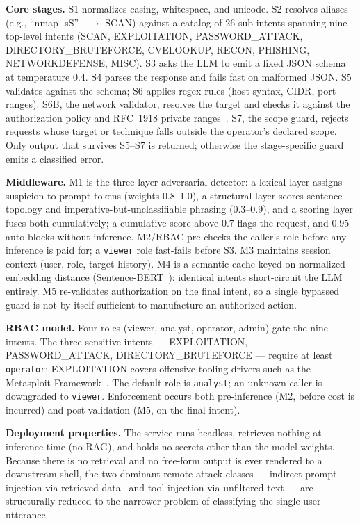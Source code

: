 \documentclass[conference]{IEEEtran}
\begin{document}
\textbf{Core stages.} S1 normalizes casing, whitespace, and unicode. S2 resolves aliases (e.g., ``nmap -sS''~\cite{lyon2009nmap} $\rightarrow$ SCAN) against a catalog of 26 sub-intents spanning nine top-level intents (SCAN, EXPLOITATION, PASSWORD\_\-ATTACK, DIRECTORY\_\-BRUTE\-FORCE, CVE\-LOOKUP, RECON, PHISHING, NETWORK\-DEFENSE, MISC). S3 asks the LLM to emit a fixed JSON schema at temperature 0.4. S4 parses the response and fails fast on malformed JSON. S5 validates against the schema; S6 applies regex rules (host syntax, CIDR, port ranges). S6B, the network validator, resolves the target and checks it against the authorization policy and RFC~1918 private ranges~\cite{rfc1918}. S7, the scope guard, rejects requests whose target or technique falls outside the operator's declared scope. Only output that survives S5--S7 is returned; otherwise the stage-specific guard emits a classified error.

\textbf{Middleware.} M1 is the three-layer adversarial detector: a lexical layer assigns suspicion to prompt tokens (weights 0.8--1.0), a structural layer scores sentence topology and imperative-but-unclassifiable phrasing (0.3--0.9), and a scoring layer fuses both cumulatively; a cumulative score above 0.7 flags the request, and 0.95 auto-blocks without inference. M2/RBAC pre checks the caller's role before any inference is paid for; a \texttt{viewer} role fast-fails before S3. M3 maintains session context (user, role, target history). M4 is a semantic cache keyed on normalized embedding distance (Sentence-BERT~\cite{reimers2019sbert}): identical intents short-circuit the LLM entirely. M5 re-validates authorization on the final intent, so a single bypassed guard is not by itself sufficient to manufacture an authorized action.

\textbf{RBAC model.} Four roles (viewer, analyst, operator, admin) gate the nine intents. The three sensitive intents --- EXPLOITATION, PASSWORD\_ATTACK, DIRECTORY\_BRUTEFORCE --- require at least \texttt{operator}; EXPLOITATION covers offensive tooling drivers such as the Metasploit Framework~\cite{metasploit}. The default role is \texttt{analyst}; an unknown caller is downgraded to \texttt{viewer}. Enforcement occurs both pre-inference (M2, before cost is incurred) and post-validation (M5, on the final intent).

\textbf{Deployment properties.} The service runs headless, retrieves nothing at inference time (no RAG), and holds no secrets other than the model weights. Because there is no retrieval and no free-form output is ever rendered to a downstream shell, the two dominant remote attack classes --- indirect prompt injection via retrieved data~\cite{greshake2023indirect} and tool-injection via unfiltered text --- are structurally reduced to the narrower problem of classifying the single user utterance.
\end{document}
